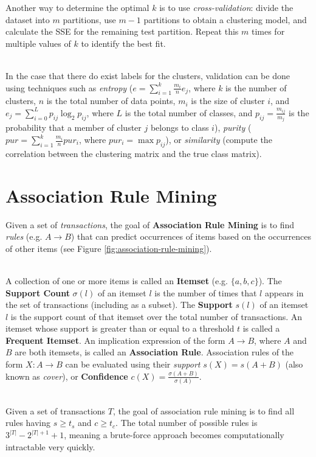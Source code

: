 \documentclass[12pt]{article}
\begin{document}
\noindent
Another way to determine the optimal $k$ is to use \textit{cross-validation}: divide the dataset into $m$ partitions, use $m - 1$ partitions to obtain a clustering model, and calculate the SSE for the remaining test partition.
Repeat this $m$ times for multiple values of $k$ to identify the best fit.

\noindent
\\
In the case that there do exist labels for the clusters, validation can be done using techniques such as \textit{entropy} ($e = \sum_{i = 1}^k \frac{m_i}{n} e_j$, where $k$ is the number of clusters, $n$ is the total number of data points, $m_i$ is the size of cluster $i$, and $e_j = \sum_{i = 0}^L p_{ij} \log_2 p_{ij}$, where $L$ is the total number of classes, and $p_{ij} = \frac{m_{ij}}{m_j}$ is the probability that a member of cluster $j$ belongs to class $i$), \textit{purity} ($pur = \sum_{i = 1}^k \frac{m_i}{n} pur_i$, where $pur_i = \max p_{ij}$), or \textit{similarity} (compute the correlation between the clustering matrix and the true class matrix).

%
%
\newpage
\section{Association Rule Mining}
Given a set of \textit{transactions}, the goal of \textbf{Association Rule Mining} is to find \textit{rules} (e.g. $A \rightarrow B$) that can predict occurrences of items based on the occurrences of other items (see Figure \ref{fig:association-rule-mining}).

\noindent
\\
A collection of one or more items is called an \textbf{Itemset} (e.g. $\{ a, b, c \}$).
The \textbf{Support Count} $\sigma(l)$ of an itemset $l$ is the number of times that $l$ appears in the set of transactions (including as a subset).
The \textbf{Support} $s(l)$ of an itemset $l$ is the support count of that itemset over the total number of transactions.
An itemset whose support is greater than or equal to a threshold $t$ is called a \textbf{Frequent Itemset}.
An implication expression of the form $A \rightarrow B$, where $A$ and $B$ are both itemsets, is called an \textbf{Association Rule}.
Association rules of the form $X: A \rightarrow B$ can be evaluated using their \textit{support} $s(X) = s(A + B)$ (also known as \textit{cover}), or \textbf{Confidence} $c(X) = \frac{\sigma(A + B)}{\sigma(A)}$.

\noindent
\\
Given a set of transactions $T$, the goal of association rule mining is to find all rules having $s \geq t_s$ and $c \geq t_c$.
The total number of possible rules is $3^{|T|} - 2^{|T|+1} + 1$, meaning a brute-force approach becomes computationally intractable very quickly.
\end{document}
